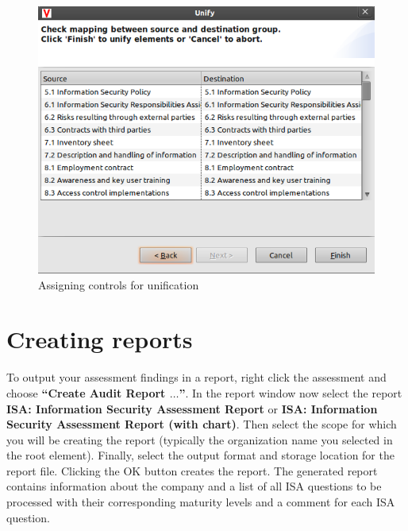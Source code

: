 \documentclass[a4paper,10pt]{book}
\begin{document}
\begin{figure}[htb!]
  \centering
  \includegraphics[scale=.6]{Screenshot/Isa_konsolidator_2-en.png}
  \caption{\label{Assigning controls for unification} Assigning controls for unification}
\end{figure}

\section{Creating reports}
\label{sec:vda-creating-reports}

To output your assessment findings in a report, right click the
assessment and choose \textbf{``Create Audit Report $\hdots$''}. In
the report window now select the report \textbf{ISA: Information
  Security Assessment Report} or \textbf{ISA: Information Security
  Assessment Report (with chart)}. Then select the scope for which you
will be creating the report (typically the organization name you
selected in the root element). Finally, select the output format and
storage location for the report file. Clicking the OK button creates
the report. The generated report contains information about the
company and a list of all ISA questions to be processed with their
corresponding maturity levels and a comment for each ISA question.
\end{document}
